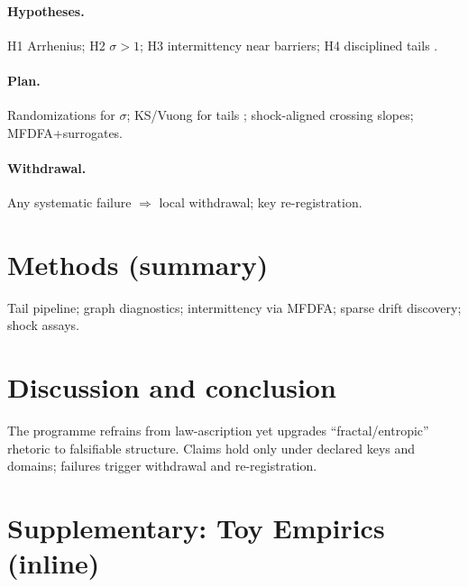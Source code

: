 \documentclass[sn-basic]{sn-jnl}
\begin{document}
\paragraph{Hypotheses.} H1 Arrhenius; H2 $\sigma>1$; H3 intermittency near barriers; H4 disciplined tails \citep{ClausetShaliziNewman2009,Newman2005,StumpfPorter2012}.
\paragraph{Plan.} Randomizations for $\sigma$; KS/Vuong for tails \citep{Vuong1989}; shock-aligned crossing slopes; MFDFA+surrogates.
\paragraph{Withdrawal.} Any systematic failure $\Rightarrow$ local withdrawal; key re-registration.

\section*{Methods (summary)}
Tail pipeline; graph diagnostics; intermittency via MFDFA; sparse drift discovery; shock assays.

\section{Discussion and conclusion}\label{sec:conclusion}
The programme refrains from law-ascription yet upgrades “fractal/entropic” rhetoric to falsifiable structure.
Claims hold only under declared keys and domains; failures trigger withdrawal and re-registration.

\appendix
\section{Supplementary: Toy Empirics (inline)}\label{sec:supp-toy}
\end{document}
